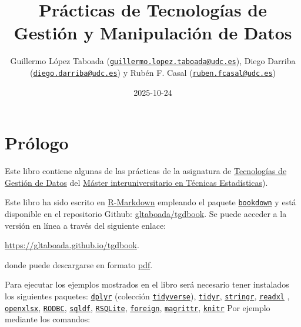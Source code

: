 \documentclass[
]{book}
\title{Prácticas de Tecnologías de Gestión y Manipulación de Datos}
\author{Guillermo López Taboada (\href{mailto:guillermo.lopez.taboada@udc.es}{\nolinkurl{guillermo.lopez.taboada@udc.es}}), Diego Darriba (\href{mailto:diego.darriba@udc.es}{\nolinkurl{diego.darriba@udc.es}}) y Rubén F. Casal (\href{mailto:ruben.fcasal@udc.es}{\nolinkurl{ruben.fcasal@udc.es}})}
\date{2025-10-24}
\begin{document}
\maketitle

{
\setcounter{tocdepth}{1}
\tableofcontents
}
\chapter*{Prólogo}\label{pruxf3logo}

Este libro contiene algunas de las prácticas de la asignatura de
\href{http://eamo.usc.es/pub/mte/index.php/es/?option=com_content&view=article&id=2202&idm=38&a\%C3\%B1o=2020}{Tecnologías de Gestión de
Datos}
del \href{http://eio.usc.es/pub/mte}{Máster interuniversitario en Técnicas
Estadísticas}).

Este libro ha sido escrito en \href{http://rmarkdown.rstudio.com}{R-Markdown}
empleando el paquete \href{https://bookdown.org/yihui/bookdown/}{\texttt{bookdown}}
y está disponible en el repositorio Github:
\href{https://github.com/gltaboada/tgdbook}{gltaboada/tgdbook}. Se puede
acceder a la versión en línea a través del siguiente enlace:

\url{https://gltaboada.github.io/tgdbook}.

donde puede descargarse en formato
\href{https://gltaboada.github.io/tgdbook/Practicas_de_TGD.pdf}{pdf}.

Para ejecutar los ejemplos mostrados en el libro será necesario tener
instalados los siguientes paquetes:
\href{https://dplyr.tidyverse.org}{\texttt{dplyr}} (colección
\href{https://www.tidyverse.org/}{\texttt{tidyverse}}),
\href{https://tidyr.tidyverse.org}{\texttt{tidyr}},
\href{https://stringr.tidyverse.org}{\texttt{stringr}},
\href{https://readxl.tidyverse.org}{\texttt{readxl}} ,
\href{https://cran.r-project.org/web/packages/openxlsx/index.html}{\texttt{openxlsx}},
\href{https://cran.r-project.org/web/packages/RODBC/index.html}{\texttt{RODBC}},
\href{https://cran.r-project.org/web/packages/sqldf/index.html}{\texttt{sqldf}},
\href{https://r-dbi.github.io/RSQLite}{\texttt{RSQLite}},
\href{https://cran.r-project.org/web/packages/foreign/index.html}{\texttt{foreign}},
\href{https://cran.r-project.org/web/packages/magrittr/index.html}{\texttt{magrittr}},
\href{https://yihui.name/knitr}{\texttt{knitr}} Por ejemplo mediante los comandos:
\end{document}
